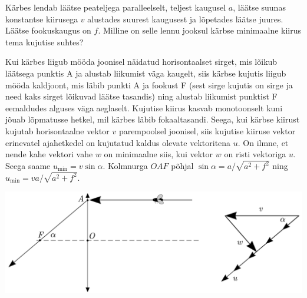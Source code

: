 \setAuthor{}

Kärbes lendab läätse peateljega paralleelselt, teljest kaugusel $a$, läätse suunas konstantse kiirusega $v$ alustades suurest kaugusest ja lõpetades läätse juures. Läätse fookuskaugus on $f$. Milline on selle lennu jooksul kärbse minimaalne kiirus tema kujutise suhtes? 

\hint

\solu
Kui kärbes liigub mööda joonisel näidatud horisontaalset sirget, mis lõikub läätsega punktis A ja alustab liikumist väga kaugelt, siis kärbse kujutis liigub mööda kaldjoont, mis läbib punkti A ja fookust F (sest sirge kujutis on sirge ja need kaks sirget lõikuvad läätse tasandis) ning alustab liikumist punktist F eemaldudes alguses väga aeglaselt. Kujutise kiirus kasvab monotoonselt kuni jõuab lõpmatusse hetkel, mil kärbes läbib fokaaltasandi. Seega, kui kärbse kiirust kujutab horisontaalne vektor $v$ parempoolsel joonisel, siis kujutise kiiruse vektor erinevatel ajahetkedel on kujutatud kaldus olevate vektoritena $u$. On ilmne, et nende kahe vektori vahe $w$ on minimaalne siis, kui vektor $w$ on risti vektoriga $u$. Seega saame $u_{\min}=v\sin\alpha$. Kolmnurga $OAF$ põhjal $\sin\alpha=a/\sqrt{a^2+f^2}$ ning $u_{\min}=va/\sqrt{a^2+f^2}$.\\

\begin{center}
\includegraphics[scale=0.7]{2019-v3g-08-yl.pdf}
\end{center}
\probend